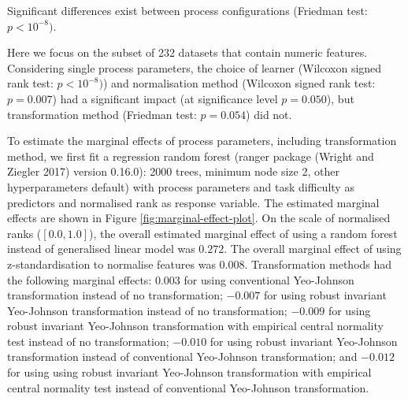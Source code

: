 \documentclass[preprint,12pt,authoryear]{elsarticle}
\begin{document}
Significant differences exist between process configurations (Friedman
test: \(p < 10^{-8})\).

Here we focus on the subset of 232 datasets that contain numeric
features. Considering single process parameters, the choice of learner
(Wilcoxon signed rank test: \(p < 10^{-8})\)) and normalisation method
(Wilcoxon signed rank test: \(p = 0.007\)) had a significant impact (at
significance level \(p = 0.050\)), but transformation method (Friedman
test: \(p = 0.054\)) did not.

To estimate the marginal effects of process parameters, including
transformation method, we first fit a regression random forest (ranger
package (Wright and Ziegler 2017) version 0.16.0): 2000 trees, minimum
node size 2, other hyperparameters default) with process parameters and
task difficulty as predictors and normalised rank as response variable.
The estimated marginal effects are shown in Figure
\ref{fig:marginal-effect-plot}. On the scale of normalised ranks
(\([0.0, 1.0]\)), the overall estimated marginal effect of using a
random forest instead of generalised linear model was \(0.272\). The
overall marginal effect of using z-standardisation to normalise features
was \(0.008\). Transformation methods had the following marginal
effects: \(0.003\) for using conventional Yeo-Johnson transformation
instead of no transformation; \(-0.007\) for using robust invariant
Yeo-Johnson transformation instead of no transformation; \(-0.009\) for
using robust invariant Yeo-Johnson transformation with empirical central
normality test instead of no transformation; \(-0.010\) for using robust
invariant Yeo-Johnson transformation instead of conventional Yeo-Johnson
transformation; and \(-0.012\) for using using robust invariant
Yeo-Johnson transformation with empirical central normality test instead
of conventional Yeo-Johnson transformation.
\end{document}
